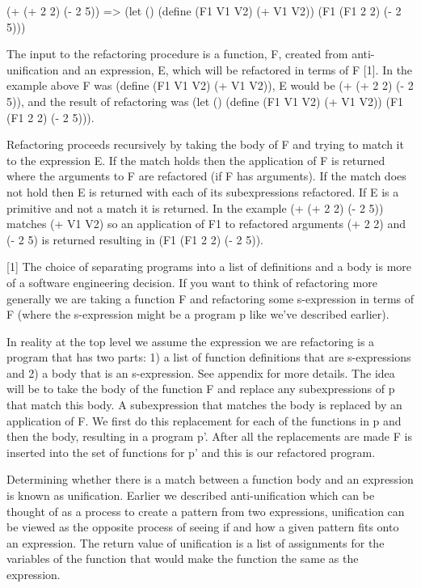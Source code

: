 \documentclass[a4paper,10pt]{article}
\begin{document}
(+ (+ 2 2) (- 2 5))
=>
(let ()
  (define (F1 V1 V2) (+ V1 V2))
  (F1 (F1 2 2) (- 2 5)))

The input to the refactoring procedure is a function, F, created from anti-unification and an expression, E, which will be refactored in terms of F [1].  In the example above F was (define (F1 V1 V2) (+ V1 V2)), E would be (+ (+ 2 2) (- 2 5)), and the result of refactoring was 
(let ()
  (define (F1 V1 V2) (+ V1 V2))
  (F1 (F1 2 2) (- 2 5))).

Refactoring proceeds recursively by taking the body of F and trying to match it to the expression E.  If the match holds then the application of F is returned where the arguments to F are refactored (if F has arguments).  If the match does not hold then E is returned with each of its subexpressions refactored.  If E is a primitive and not a match it is returned.  In the example (+ (+ 2 2) (- 2 5)) matches (+ V1 V2) so an application of F1 to refactored arguments (+ 2 2) and (- 2 5) is returned resulting in (F1 (F1 2 2) (- 2 5)).  



[1] 
The choice of separating programs into a list of definitions and a body is more of a software engineering decision.  If you want to think of refactoring more generally we are taking a function F and refactoring some s-expression in terms of F (where the s-expression might be a program p like we've described earlier).   

In reality at the top level we assume the expression we are refactoring is a program that has two parts: 1) a list of function definitions that are s-expressions and 2) a body that is an s-expression.  See appendix for more details.
The idea will be to take the body of the function F and replace any subexpressions of p that match this body.  A subexpression that matches the body is replaced by an application of F.
We first do this replacement for each of the functions in p and then the body, resulting in a program p'.  After all the replacements are made F is inserted into the set of functions for p' and this is our refactored program.

Determining whether there is a match between a function body and an expression is known as unification.  Earlier we described anti-unification which can be thought of as a process to create a pattern from two expressions, unification can be viewed as the opposite process of seeing if and how a given pattern fits onto an expression.  The return value of unification is a list of assignments for the variables of the function that would make the function the same as the expression.
\end{document}
